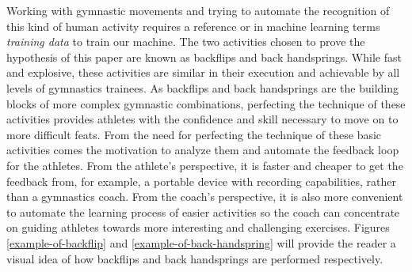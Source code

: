 Working with gymnastic movements and trying to automate the recognition of this kind of human activity requires a reference or in machine learning terms \textit{training data} to train our machine. The two activities chosen to prove the hypothesis of this paper are known as backflips and back handsprings. While fast and explosive, these activities are similar in their execution and achievable by all levels of gymnastics trainees. As backflips and back handsprings are the building blocks of more complex gymnastic combinations, perfecting the technique of these activities provides athletes with the confidence and skill necessary to move on to more difficult feats. From the need for perfecting the technique of these basic activities comes the motivation to analyze them and automate the feedback loop for the athletes. From the athlete's perspective, it is faster and cheaper to get the feedback from, for example, a portable device with recording capabilities, rather than a gymnastics coach. From the coach's perspective, it is also more convenient to automate the learning process of easier activities so the coach can concentrate on guiding athletes towards more interesting and challenging exercises. Figures \ref{example-of-backflip} and \ref{example-of-back-handspring} will provide the reader a visual idea of how backflips and back handsprings are performed respectively. 

